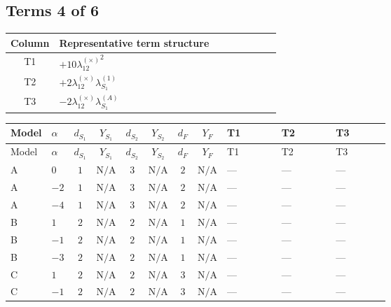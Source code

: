 \documentclass[8pt]{article}
\begin{document}
\begin{landscape}
\subsection*{Terms 4 of 6}
\begin{center}
\begin{tabular}{@{}c >{\raggedright\arraybackslash}p{0.82\linewidth}@{}}
\toprule
Column & Representative term structure \\
\midrule
T1 & \(\displaystyle +10 {\lambda_{12}^{(\times)}}^2\) \\
\midrule
T2 & \(\displaystyle +2 {\lambda_{12}^{(\times)}} {\lambda_{S_1}^{(1)}}\) \\
\midrule
T3 & \(\displaystyle -2 {\lambda_{12}^{(\times)}} {\lambda_{S_1}^{(A)}}\) \\
\midrule
\bottomrule
\end{tabular}
\end{center}
\smallskip
\tiny
\begin{longtable}{@{}llcccccc >{\raggedright\arraybackslash}p{0.21\linewidth} >{\raggedright\arraybackslash}p{0.21\linewidth} >{\raggedright\arraybackslash}p{0.21\linewidth}@{}}
\toprule
Model & $\alpha$ & $d_{S_1}$ & $Y_{S_1}$ & $d_{S_2}$ & $Y_{S_2}$ & $d_F$ & $Y_F$ & T1 & T2 & T3 \\
\midrule
\endfirsthead
\toprule
Model & $\alpha$ & $d_{S_1}$ & $Y_{S_1}$ & $d_{S_2}$ & $Y_{S_2}$ & $d_F$ & $Y_F$ & T1 & T2 & T3 \\
\midrule
\endhead
A & $0$ & $1$ & $\text{N/A}$ & $3$ & $\text{N/A}$ & $2$ & $\text{N/A}$ & --- & --- & --- \\
\midrule
A & $-2$ & $1$ & $\text{N/A}$ & $3$ & $\text{N/A}$ & $2$ & $\text{N/A}$ & --- & --- & --- \\
\midrule
A & $-4$ & $1$ & $\text{N/A}$ & $3$ & $\text{N/A}$ & $2$ & $\text{N/A}$ & --- & --- & --- \\
\midrule
B & $1$ & $2$ & $\text{N/A}$ & $2$ & $\text{N/A}$ & $1$ & $\text{N/A}$ & --- & --- & --- \\
\midrule
B & $-1$ & $2$ & $\text{N/A}$ & $2$ & $\text{N/A}$ & $1$ & $\text{N/A}$ & --- & --- & --- \\
\midrule
B & $-3$ & $2$ & $\text{N/A}$ & $2$ & $\text{N/A}$ & $1$ & $\text{N/A}$ & --- & --- & --- \\
\midrule
C & $1$ & $2$ & $\text{N/A}$ & $2$ & $\text{N/A}$ & $3$ & $\text{N/A}$ & --- & --- & --- \\
\midrule
C & $-1$ & $2$ & $\text{N/A}$ & $2$ & $\text{N/A}$ & $3$ & $\text{N/A}$ & --- & --- & --- \\

\end{longtable}
\end{landscape}
\end{document}
